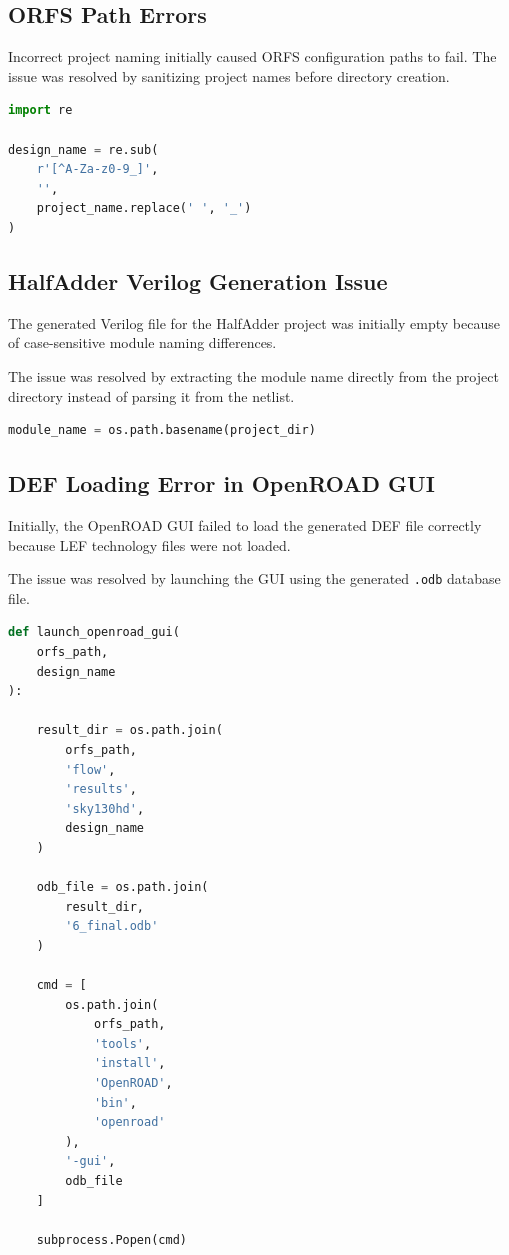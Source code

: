 \subsection{ORFS Path Errors}

Incorrect project naming initially caused ORFS configuration paths to fail. The issue was resolved by sanitizing project names before directory creation.

\begin{lstlisting}[language=python,
caption={Project name sanitization.}]
import re

design_name = re.sub(
    r'[^A-Za-z0-9_]',
    '',
    project_name.replace(' ', '_')
)
\end{lstlisting}

\subsection{HalfAdder Verilog Generation Issue}

The generated Verilog file for the HalfAdder project was initially empty because of case-sensitive module naming differences.

The issue was resolved by extracting the module name directly from the project directory instead of parsing it from the netlist.

\begin{lstlisting}[language=python,
caption={Module name extraction fix.}]
module_name = os.path.basename(project_dir)
\end{lstlisting}

\subsection{DEF Loading Error in OpenROAD GUI}

Initially, the OpenROAD GUI failed to load the generated DEF file correctly because LEF technology files were not loaded.

The issue was resolved by launching the GUI using the generated \texttt{.odb} database file.

\begin{lstlisting}[language=python,
caption={Corrected OpenROAD GUI launch.}]
def launch_openroad_gui(
    orfs_path,
    design_name
):

    result_dir = os.path.join(
        orfs_path,
        'flow',
        'results',
        'sky130hd',
        design_name
    )

    odb_file = os.path.join(
        result_dir,
        '6_final.odb'
    )

    cmd = [
        os.path.join(
            orfs_path,
            'tools',
            'install',
            'OpenROAD',
            'bin',
            'openroad'
        ),
        '-gui',
        odb_file
    ]

    subprocess.Popen(cmd)
\end{lstlisting}

